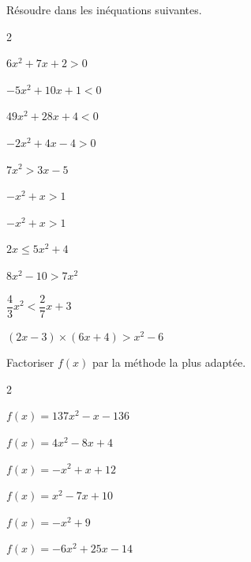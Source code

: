 \documentclass[11pt,a4paper]{article}  %
\begin{document}
Résoudre dans \R les inéquations suivantes.
\begin{multicols}{2}
\begin{enumMet}
	\item $6 x^2+7 x+2>0$
	\item $-5 x^2+10 x+1<0$
	\item $49 x^2+28 x+4<0$
	\item $-2 x^2+4 x-4>0$
	\item $7 x^2>3 x-5$
	\item $-x^2+x>1$
	\item $-x^2+x>1$
	\item $2 x \leqslant 5 x^2+4$
	\item $8 x^2-10>7 x^2$
	\item $\dfrac{4}{3} x^2<\dfrac{2}{7} x+3$
	\item $(2 x-3) \times(6 x+4)>x^2-6$
\end{enumMet}
\end{multicols}

Factoriser $f(x)$ par la méthode la plus adaptée.
\begin{multicols}{2}
	\begin{enumMet}
		\item $f(x)=137 x^2-x-136$
		\item $f(x)=4 x^2-8 x+4$
		\item $f(x)=-x^2+x+12$
		\item $f(x)=x^2-7 x+10$
		\item $f(x)=-x^2+9$
		\item $f(x)=-6 x^2+25 x-14$
	\end{enumMet}
\end{multicols}
\end{document}
